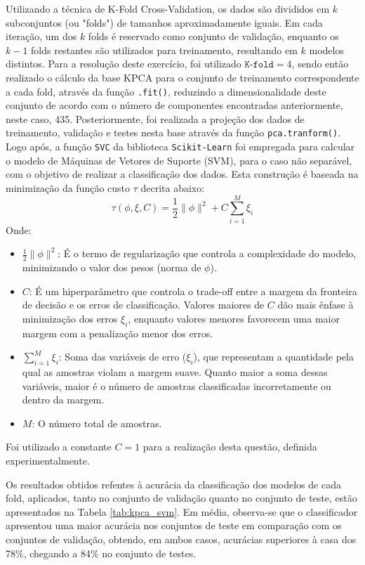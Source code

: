 \documentclass[]{abntex2}
\begin{document}
Utilizando a técnica de K-Fold Cross-Validation, os dados são divididos em \( k \) subconjuntos (ou "folds") de tamanhos aproximadamente iguais. Em cada iteração, um dos \( k \) folds é reservado como conjunto de validação, enquanto os \( k-1 \) folds restantes são utilizados para treinamento, resultando em \( k \) modelos distintos. Para a resolução deste exercício, foi utilizado \( \texttt{K-fold} = 4 \), sendo então realizado o cálculo da base KPCA para o conjunto de treinamento correspondente a cada fold, através da função \texttt{.fit()}, reduzindo a dimensionalidade deste conjunto de acordo com o número de componentes encontradas anteriormente, neste caso, 435. Posteriormente, foi realizada a projeção dos dados de treinamento, validação e testes nesta base através da função \texttt{pca.tranform()}. Logo após, a função \texttt{SVC} da biblioteca \texttt{Scikit-Learn} foi empregada para calcular o modelo de Máquinas de Vetores de Suporte (SVM), para o caso não separável, com o objetivo de realizar a classificação dos dados. Esta construção é baseada na minimização da função custo $\tau$ decrita abaixo:
\[
\tau(\phi, \xi, C) = \frac{1}{2} \|\phi\|^2 + C \sum_{i=1}^{M} \xi_i
\]
Onde:
\begin{itemize}
    \item \(\frac{1}{2} \|\phi\|^2\): É o termo de regularização que controla a complexidade do modelo, minimizando o valor dos pesos (norma de \(\phi\)).
    \item \(C\): É um hiperparâmetro que controla o trade-off entre a margem da fronteira de decisão e os erros de classificação. Valores maiores de \(C\) dão mais ênfase à minimização dos erros \(\xi_i\), enquanto valores menores favorecem uma maior margem com a penalização menor dos erros.
    \item \(\sum_{i=1}^{M} \xi_i\): Soma das variáveis de erro (\(\xi_i\)), que representam a quantidade pela qual as amostras violam a margem suave. Quanto maior a soma dessas variáveis, maior é o número de amostras classificadas incorretamente ou dentro da margem.
    \item \(M\): O número total de amostras.
\end{itemize}

Foi utilizado a constante $C=1$ para a realização desta questão, definida experimentalmente.

Os resultados obtidos refentes à acurácia da classificação dos modelos de cada fold, aplicados, tanto no conjunto de validação quanto no conjunto de teste, estão apresentados na Tabela \ref{tab:kpca_svm}. Em média, observa-se que o classificador apresentou uma maior acurácia nos conjuntos de teste em comparação com os conjuntos de validação, obtendo, em ambos casos, acurácias superiores à casa dos 78\%, chegando a 84\% no conjunto de testes.
\end{document}
